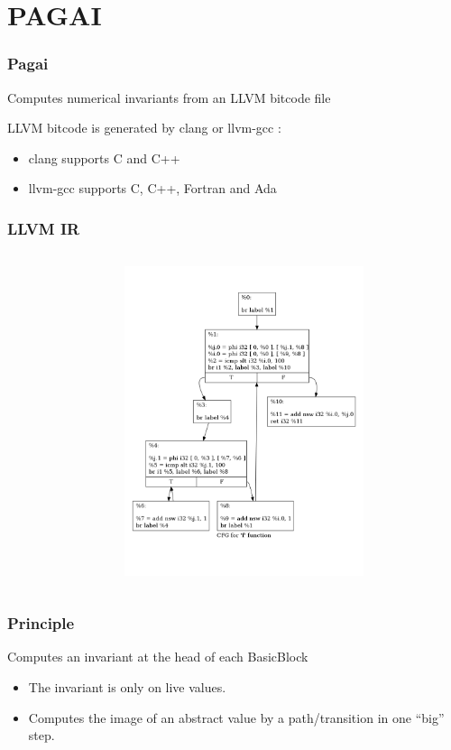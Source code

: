 \documentclass{beamer}
\begin{document}
\section{PAGAI}
\begin{frame}
	\frametitle{Pagai}

	\begin{center}
	Computes numerical invariants from an LLVM bitcode file
	\end{center}

	\vspace{1cm}

	LLVM bitcode is generated by clang or llvm-gcc :
	\begin{itemize}
		\item clang supports C and C++
		\item llvm-gcc supports C, C++, Fortran and Ada
	\end{itemize}
\end{frame}

\begin{frame}
	\frametitle{LLVM IR}
\begin{columns}
	
\begin{column}{1cm}
\end{column}
\begin{column}{10cm}
	\includegraphics[width=7cm]{f.pdf}
\end{column}
\end{columns}

\end{frame}

\begin{frame}
	\frametitle{Principle}

	Computes an invariant at the head of each BasicBlock

	\vspace{1cm}

	\begin{itemize}
		\item The invariant is only on live values.
		\item Computes the image of an abstract value by a path/transition in
			one ``big'' step.
	\end{itemize}
\end{frame}
\end{document}
